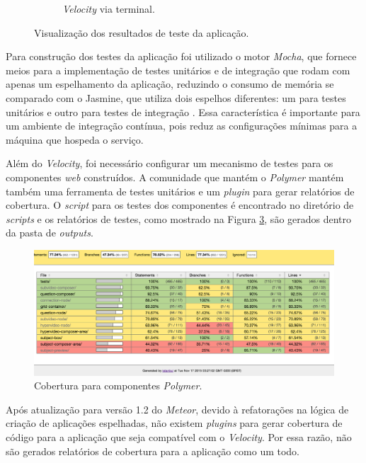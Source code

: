 \begin{figure}[h!]
\begin{subfigure}{.45\textwidth}
  		\caption{\textit{Velocity} via terminal.}
  		\label{fig:teste_b}
	\end{subfigure}
	\caption{Visualização dos resultados de teste da aplicação.}
	\label{fig:testes}
\end{figure}

Para construção dos testes da aplicação foi utilizado o motor \textit{Mocha}, que fornece meios para a implementação de testes unitários e de integração que rodam com apenas um espelhamento da aplicação, reduzindo o consumo de memória se comparado com o Jasmine, que utiliza dois espelhos diferentes: um para testes unitários e outro para testes de integração \cite{jasmine2015}. Essa característica é importante para um ambiente de integração contínua, pois reduz as configurações mínimas para a máquina que hospeda o serviço.

Além do \textit{Velocity}, foi necessário configurar um mecanismo de testes para os componentes \textit{web} construídos. A comunidade que mantém o \textit{Polymer} mantém também uma ferramenta de testes unitários e um \textit{plugin} para gerar relatórios de cobertura. O \textit{script} para os testes dos componentes é encontrado no diretório de \textit{scripts} e os relatórios de testes, como mostrado na Figura \ref{fig:teste_polymer}, são gerados dentro da pasta de \textit{outputs}.

\begin{figure}[h!]
  	\centering
  	\includegraphics[width=1\linewidth]{figuras/teste_polymer.eps}
  	\caption{Cobertura para componentes \textit{Polymer}.}
  	\label{fig:teste_polymer}
\end{figure}

Após atualização para versão 1.2 do \textit{Meteor}, devido à refatorações na lógica de criação de aplicações espelhadas, não existem \textit{plugins} para gerar cobertura de código para a aplicação que seja compatível com o \textit{Velocity}. Por essa razão, não são gerados relatórios de cobertura para a aplicação como um todo.

